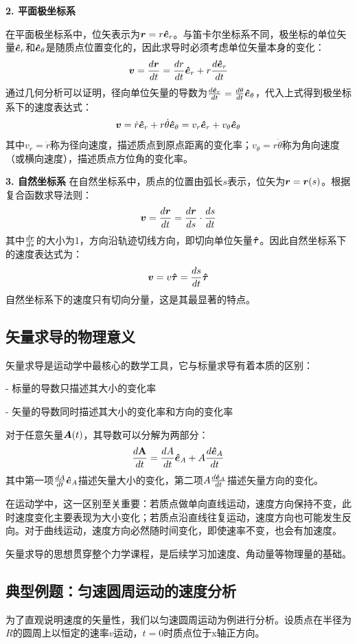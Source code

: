 \textbf{2. 平面极坐标系}

在平面极坐标系中，位矢表示为$\boldsymbol{r}=r\boldsymbol{\hat{e}}_r$。与笛卡尔坐标系不同，极坐标的单位矢量$\boldsymbol{\hat{e}}_r$和$\boldsymbol{\hat{e}}_\theta$是随质点位置变化的，因此求导时必须考虑单位矢量本身的变化：
\[
\boldsymbol{v} = \frac{d\boldsymbol{r}}{dt} = \frac{dr}{dt}\boldsymbol{\hat{e}}_r + r\frac{d\boldsymbol{\hat{e}}_r}{dt}
\]
通过几何分析可以证明，径向单位矢量的导数为$\frac{d\boldsymbol{\hat{e}}_r}{dt}=\frac{d\theta}{dt}\boldsymbol{\hat{e}}_\theta$，代入上式得到极坐标系下的速度表达式：
\[
\boldsymbol{v} = \dot{r}\boldsymbol{\hat{e}}_r + r\dot{\theta}\boldsymbol{\hat{e}}_\theta = v_r\boldsymbol{\hat{e}}_r + v_\theta\boldsymbol{\hat{e}}_\theta
\]
其中$v_r=\dot{r}$称为径向速度，描述质点到原点距离的变化率；$v_\theta=r\dot{\theta}$称为角向速度（或横向速度），描述质点方位角的变化率。

\textbf{3. 自然坐标系}
在自然坐标系中，质点的位置由弧长$s$表示，位矢为$\boldsymbol{r}=\boldsymbol{r}(s)$。根据复合函数求导法则：
\[
\boldsymbol{v} = \frac{d\boldsymbol{r}}{dt} = \frac{d\boldsymbol{r}}{ds} \cdot \frac{ds}{dt}
\]
其中$\frac{d\boldsymbol{r}}{ds}$的大小为1，方向沿轨迹切线方向，即切向单位矢量$\boldsymbol{\hat{\tau}}$。因此自然坐标系下的速度表达式为：
\[
\boldsymbol{v} = v\boldsymbol{\hat{\tau}} = \frac{ds}{dt}\boldsymbol{\hat{\tau}}
\]
自然坐标系下的速度只有切向分量，这是其最显著的特点。

\subsection{矢量求导的物理意义}
矢量求导是运动学中最核心的数学工具，它与标量求导有着本质的区别：

- 标量的导数只描述其大小的变化率

- 矢量的导数同时描述其大小的变化率和方向的变化率

对于任意矢量$\boldsymbol{A}(t)$，其导数可以分解为两部分：
\[
\frac{d\mathbf{A}}{dt} = \frac{dA}{dt}\boldsymbol{\hat{e}}_A + A\frac{d\boldsymbol{\hat{e}}_A}{dt}
\]
其中第一项$\frac{dA}{dt}\boldsymbol{\hat{e}}_A$描述矢量大小的变化，第二项$A\frac{d\boldsymbol{\hat{e}}_A}{dt}$描述矢量方向的变化。

在运动学中，这一区别至关重要：若质点做单向直线运动，速度方向保持不变，此时速度变化主要表现为大小变化；若质点沿直线往复运动，速度方向也可能发生反向。对于曲线运动，速度方向必然随时间变化，即使速率不变，也会有加速度。

矢量求导的思想贯穿整个力学课程，是后续学习加速度、角动量等物理量的基础。

\subsection{典型例题：匀速圆周运动的速度分析}
为了直观说明速度的矢量性，我们以匀速圆周运动为例进行分析。设质点在半径为$R$的圆周上以恒定的速率$v$运动，$t=0$时质点位于x轴正方向。

